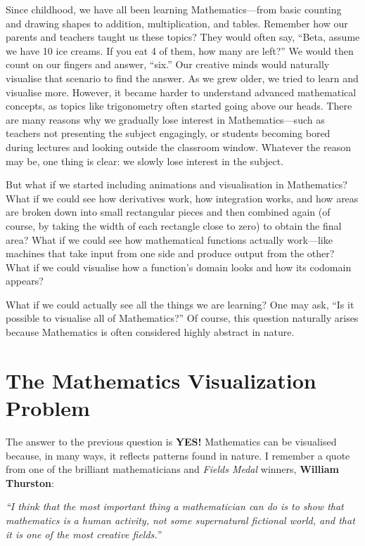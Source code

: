 \documentclass[12pt, a4paper]{report}
\begin{document}
Since childhood, we have all been learning Mathematics—from basic counting and drawing shapes to addition, multiplication, and tables. Remember how our parents and teachers taught us these topics? They would often say, ``Beta, assume we have 10 ice creams. If you eat 4 of them, how many are left?'' We would then count on our fingers and answer, ``six.'' Our creative minds would naturally visualise that scenario to find the answer. As we grew older, we tried to learn and visualise more. However, it became harder to understand advanced mathematical concepts, as topics like trigonometry often started going above our heads. There are many reasons why we gradually lose interest in Mathematics—such as teachers not presenting the subject engagingly, or students becoming bored during lectures and looking outside the classroom window. Whatever the reason may be, one thing is clear: we slowly lose interest in the subject.

But what if we started including animations and visualisation in Mathematics? What if we could see how derivatives work, how integration works, and how areas are broken down into small rectangular pieces and then combined again (of course, by taking the width of each rectangle close to zero) to obtain the final area? What if we could see how mathematical functions actually work—like machines that take input from one side and produce output from the other? What if we could visualise how a function's domain looks and how its codomain appears?

What if we could actually see all the things we are learning? One may ask, ``Is it possible to visualise all of Mathematics?'' Of course, this question naturally arises because Mathematics is often considered highly abstract in nature.

\section{The Mathematics Visualization Problem}

The answer to the previous question is \textbf{YES!} Mathematics can be visualised because, in many ways, it reflects patterns found in nature. I remember a quote from one of the brilliant mathematicians and \textit{Fields Medal} winners, \textbf{William Thurston}:

\begin{tcolorbox}[colback=gray!5!white, colframe=black!75!white, title=Quote]
\textit{``I think that the most important thing a mathematician can do is to show that mathematics is a human activity, not some supernatural fictional world, and that it is one of the most creative fields.''}
\end{tcolorbox}
\end{document}
